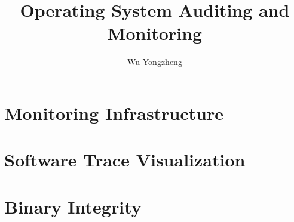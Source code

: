 \documentclass[a4paper,openany]{book}
\begin{document}
\title{Operating System Auditing and Monitoring}
\author{Wu Yongzheng}
\date{}

\frontmatter
\maketitle
\tableofcontents



\mainmatter

\chapter{Monitoring Infrastructure}




\chapter{Software Trace Visualization}


\chapter{Binary Integrity}




\backmatter


\end{document}
